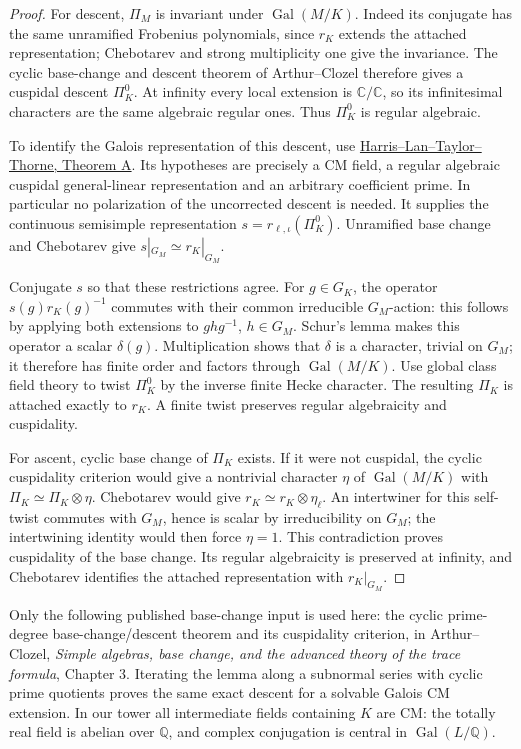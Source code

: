 \begin{proof}
For descent, \(\Pi_M\) is invariant under
\(\operatorname{Gal}(M/K)\).
Indeed its conjugate has the same unramified Frobenius
polynomials, since \(r_K\) extends the attached
representation; Chebotarev and strong multiplicity one
give the invariance.
The cyclic base-change and descent theorem of
Arthur--Clozel therefore gives a cuspidal descent
\(\Pi_K^0\).
At infinity every local extension is \(\mathbb C/\mathbb C\),
so its infinitesimal characters are the same algebraic
regular ones. Thus \(\Pi_K^0\) is regular algebraic.

To identify the Galois representation of this descent,
use
\href{https://virtualmath1.stanford.edu/~rltaylor/rigcoh.pdf}
{Harris--Lan--Taylor--Thorne, Theorem A}.
Its hypotheses are precisely a CM field, a regular
algebraic cuspidal general-linear representation and
an arbitrary coefficient prime.
In particular no polarization of the uncorrected
descent is needed.
It supplies the continuous semisimple representation
\(s=r_{\ell,\iota}(\Pi_K^0)\).
Unramified base change and Chebotarev give
\(s|_{G_M}\simeq r_K|_{G_M}\).

Conjugate \(s\) so that these restrictions agree.
For \(g\in G_K\), the operator \(s(g)r_K(g)^{-1}\)
commutes with their common irreducible \(G_M\)-action:
this follows by applying both extensions to \(ghg^{-1}\),
\(h\in G_M\).
Schur's lemma makes this operator a scalar \(\delta(g)\).
Multiplication shows that \(\delta\) is a character,
trivial on \(G_M\); it therefore has finite order and
factors through \(\operatorname{Gal}(M/K)\).
Use global class field theory to twist
\(\Pi_K^0\) by the inverse finite Hecke character.
The resulting \(\Pi_K\) is attached exactly to \(r_K\).
A finite twist preserves regular algebraicity and
cuspidality.

For ascent, cyclic base change of \(\Pi_K\) exists.
If it were not cuspidal, the cyclic cuspidality criterion
would give a nontrivial character \(\eta\) of
\(\operatorname{Gal}(M/K)\) with
\(\Pi_K\simeq\Pi_K\otimes\eta\).
Chebotarev would give \(r_K\simeq r_K\otimes\eta_\ell\).
An intertwiner for this self-twist commutes with \(G_M\),
hence is scalar by irreducibility on \(G_M\);
the intertwining identity would then force \(\eta=1\).
This contradiction proves cuspidality of the base change.
Its regular algebraicity is preserved at infinity,
and Chebotarev identifies the attached representation
with \(r_K|_{G_M}\).
\end{proof}

Only the following published base-change input is used here:
the cyclic prime-degree base-change/descent theorem and its
cuspidality criterion, in Arthur--Clozel,
\emph{Simple algebras, base change, and the advanced theory
of the trace formula}, Chapter 3.
Iterating the lemma along a subnormal series with
cyclic prime quotients proves the same exact descent
for a solvable Galois CM extension.
In our tower all intermediate fields containing \(K\)
are CM: the totally real field is abelian over
\(\mathbb Q\), and complex conjugation is central in
\(\operatorname{Gal}(L/\mathbb Q)\).

